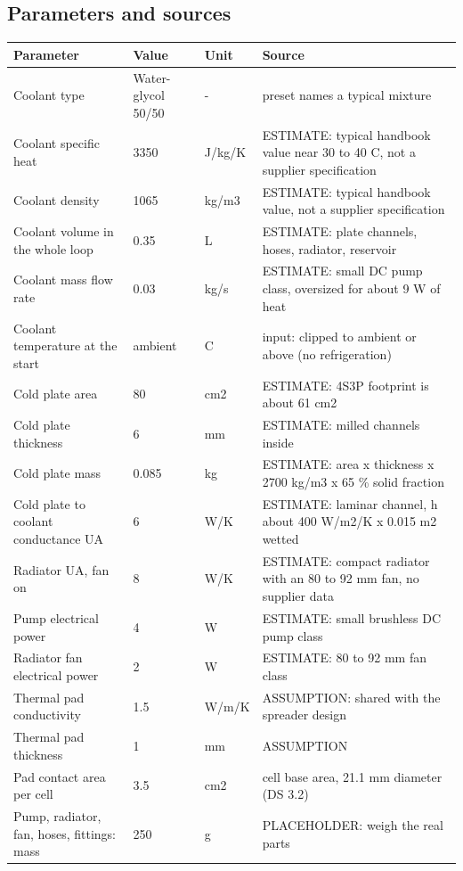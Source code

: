 \documentclass[11pt,a4paper]{article}
\begin{document}
\subsection{Parameters and sources}
\begin{table}[H]
\centering\scriptsize
\begin{tabular}{@{}p{5.4cm}p{1.4cm}p{1.5cm}p{6.7cm}@{}}
\toprule
Parameter & Value & Unit & Source \\
\midrule
Coolant type & Water-glycol 50/50 & - & preset names a typical mixture \\
Coolant specific heat & 3350 & J/kg/K & ESTIMATE: typical handbook value near 30 to 40 C, not a supplier specification \\
Coolant density & 1065 & kg/m3 & ESTIMATE: typical handbook value, not a supplier specification \\
Coolant volume in the whole loop & 0.35 & L & ESTIMATE: plate channels, hoses, radiator, reservoir \\
Coolant mass flow rate & 0.03 & kg/s & ESTIMATE: small DC pump class, oversized for about 9 W of heat \\
Coolant temperature at the start & ambient & C & input: clipped to ambient or above (no refrigeration) \\
Cold plate area & 80 & cm2 & ESTIMATE: 4S3P footprint is about 61 cm2 \\
Cold plate thickness & 6 & mm & ESTIMATE: milled channels inside \\
Cold plate mass & 0.085 & kg & ESTIMATE: area x thickness x 2700 kg/m3 x 65 \% solid fraction \\
Cold plate to coolant conductance UA & 6 & W/K & ESTIMATE: laminar channel, h about 400 W/m2/K x 0.015 m2 wetted \\
Radiator UA, fan on & 8 & W/K & ESTIMATE: compact radiator with an 80 to 92 mm fan, no supplier data \\
Pump electrical power & 4 & W & ESTIMATE: small brushless DC pump class \\
Radiator fan electrical power & 2 & W & ESTIMATE: 80 to 92 mm fan class \\
Thermal pad conductivity & 1.5 & W/m/K & ASSUMPTION: shared with the spreader design \\
Thermal pad thickness & 1 & mm & ASSUMPTION \\
Pad contact area per cell & 3.5 & cm2 & cell base area, 21.1 mm diameter (DS 3.2) \\
Pump, radiator, fan, hoses, fittings: mass & 250 & g & PLACEHOLDER: weigh the real parts \\

\end{tabular}
\end{table}
\end{document}
